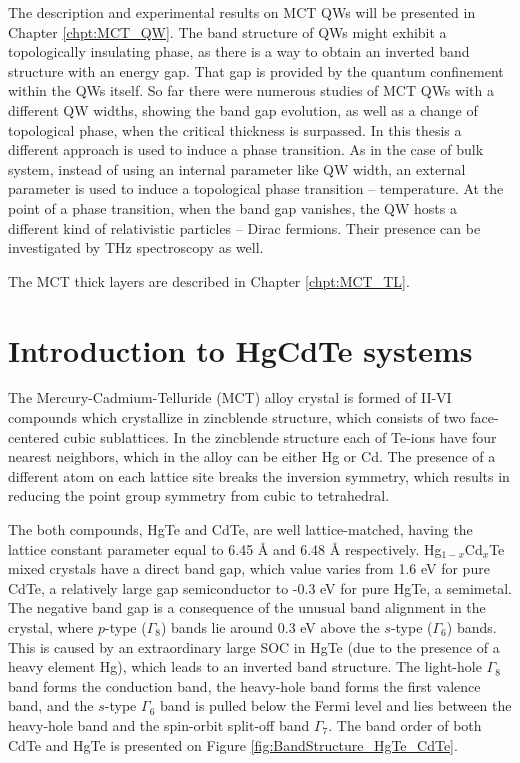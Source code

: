\documentclass[titlepage,a4paper]{book}
\newcommand{\wciecie}{\quad\phantom{v}}
\begin{document}
The description and experimental results on MCT QWs will be presented in Chapter \ref{chpt:MCT_QW}. The band structure of QWs might exhibit a topologically insulating phase, as there is a way to obtain an inverted band structure with an energy gap. That gap is provided by the quantum confinement within the QWs itself. 
So far there were numerous studies of MCT QWs with a different QW widths, showing the band gap evolution, as well as a change of topological phase, when the critical thickness is surpassed. In this thesis a different approach is used to induce a phase transition. As in the case of bulk system, instead of using an internal parameter like QW width, an external parameter is used to induce a topological phase transition -- temperature.
At the point of a phase transition, when the band gap vanishes, the QW hosts a different kind of relativistic particles -- Dirac fermions. Their presence can be investigated by THz spectroscopy as well. 

The MCT thick layers are described in Chapter \ref{chpt:MCT_TL}.  



\section{Introduction to HgCdTe systems}
\wciecie
The Mercury-Cadmium-Telluride (MCT) alloy crystal is formed of II-VI compounds which crystallize in zincblende structure, which consists of two face-centered cubic sublattices. In the zincblende structure each of Te-ions have four nearest neighbors, which in the alloy can be either Hg or Cd. The presence of a different atom on each lattice site breaks the inversion symmetry, which results in reducing the point group symmetry from cubic to tetrahedral. 

The both compounds, HgTe and CdTe, are well lattice-matched, having the lattice constant parameter equal to 6.45 Å and 6.48 Å respectively. Hg$_{1-x}$Cd$_x$Te mixed crystals have a direct band gap, which value varies from 1.6 eV for pure CdTe, a relatively large gap semiconductor to -0.3 eV for pure HgTe, a semimetal. The negative band gap is a consequence of the unusual band alignment in the crystal, where $p$-type ($\Gamma_8$) bands lie around 0.3 eV above the $s$-type ($\Gamma_6$) bands. This is caused by an extraordinary large SOC in HgTe (due to the presence of a heavy element Hg), which leads to an inverted band structure. The light-hole $\Gamma_8$ band forms the conduction band, the heavy-hole band forms the first valence band, and the $s$-type $\Gamma_6$ band is pulled below the Fermi level and lies between the heavy-hole band and the spin-orbit split-off band $\Gamma_7$. The band order of both CdTe and HgTe is presented on Figure \ref{fig:BandStructure_HgTe_CdTe}.
\end{document}
